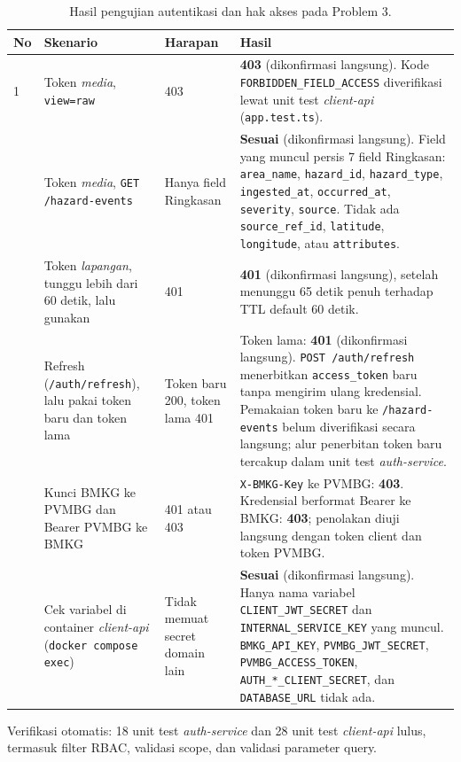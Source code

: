 \begin{table}[H]
  \centering
  \small
  \begin{tabularx}{\textwidth}{p{0.4cm}p{3.4cm}p{3.0cm}X}
    \toprule
    \textbf{No} & \textbf{Skenario} & \textbf{Harapan} & \textbf{Hasil} \\
    \midrule
    1 & Token \textit{media}, \texttt{view=raw} & 403 & \textbf{403} (dikonfirmasi langsung). Kode \texttt{FORBIDDEN\_FIELD\_ACCESS} diverifikasi lewat unit test \textit{client-api} (\texttt{app.test.ts}). \\
    \addlinespace
    2 & Token \textit{media}, \texttt{GET /hazard-events} & Hanya field Ringkasan & \textbf{Sesuai} (dikonfirmasi langsung). Field yang muncul persis 7 field Ringkasan: \texttt{area\_name}, \texttt{hazard\_id}, \texttt{hazard\_type}, \texttt{ingested\_at}, \texttt{occurred\_at}, \texttt{severity}, \texttt{source}. Tidak ada \texttt{source\_ref\_id}, \texttt{latitude}, \texttt{longitude}, atau \texttt{attributes}. \\
    \addlinespace
    3 & Token \textit{lapangan}, tunggu lebih dari 60 detik, lalu gunakan & 401 & \textbf{401} (dikonfirmasi langsung), setelah menunggu 65 detik penuh terhadap TTL default 60 detik. \\
    \addlinespace
    4 & Refresh (\texttt{/auth/refresh}), lalu pakai token baru dan token lama & Token baru 200, token lama 401 & Token lama: \textbf{401} (dikonfirmasi langsung). \texttt{POST /auth/refresh} menerbitkan \texttt{access\_token} baru tanpa mengirim ulang kredensial. Pemakaian token baru ke \texttt{/hazard-events} belum diverifikasi secara langsung; alur penerbitan token baru tercakup dalam unit test \textit{auth-service}. \\
    \addlinespace
    5 & Kunci BMKG ke PVMBG dan Bearer PVMBG ke BMKG & 401 atau 403 & \texttt{X-BMKG-Key} ke PVMBG: \textbf{403}. Kredensial berformat Bearer ke BMKG: \textbf{403}; penolakan diuji langsung dengan token client dan token PVMBG. \\
    \addlinespace
    6 & Cek variabel di container \textit{client-api} (\texttt{docker compose exec}) & Tidak memuat secret domain lain & \textbf{Sesuai} (dikonfirmasi langsung). Hanya nama variabel \texttt{CLIENT\_JWT\_SECRET} dan \texttt{INTERNAL\_SERVICE\_KEY} yang muncul. \texttt{BMKG\_API\_KEY}, \texttt{PVMBG\_JWT\_SECRET}, \texttt{PVMBG\_ACCESS\_TOKEN}, \texttt{AUTH\_*\_CLIENT\_SECRET}, dan \texttt{DATABASE\_URL} tidak ada. \\
    \bottomrule
  \end{tabularx}
  \caption{Hasil pengujian autentikasi dan hak akses pada Problem 3.}
  \label{tab:p3-bukti}
\end{table}

Verifikasi otomatis: 18 unit test \textit{auth-service} dan 28 unit test \textit{client-api}
lulus, termasuk filter RBAC, validasi scope, dan validasi parameter query.
